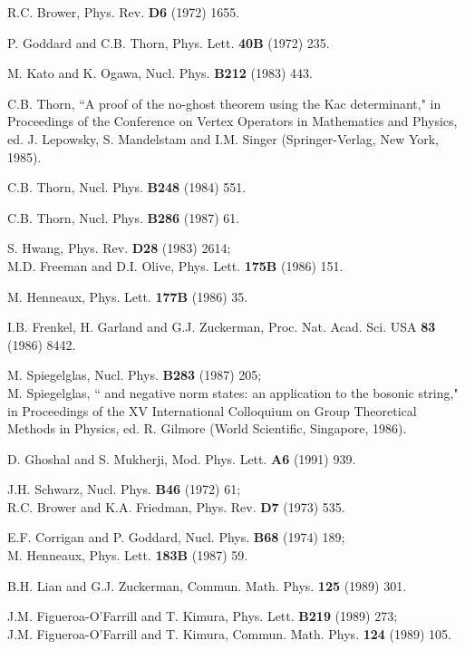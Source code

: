 \documentclass[a4paper,12pt]{article}
\begin{document}
\begin{thebibliography}{999}


R.C. Brower, Phys. Rev. {\bf D6} (1972) 1655.

P. Goddard and C.B. Thorn, Phys. Lett. {\bf 40B} (1972) 235.

M. Kato and K. Ogawa, Nucl. Phys. {\bf B212} (1983) 443.

C.B. Thorn, ``A proof of the no-ghost theorem using the Kac determinant,"
in Proceedings of the Conference on Vertex Operators
in Mathematics and Physics,
ed. J. Lepowsky, S. Mandelstam and I.M. Singer
(Springer-Verlag, New York, 1985).

C.B. Thorn, Nucl. Phys. {\bf B248} (1984) 551.

C.B. Thorn, Nucl. Phys. {\bf B286} (1987) 61.

S. Hwang, Phys. Rev. {\bf D28} (1983) 2614;\\
M.D. Freeman and D.I. Olive, Phys. Lett. {\bf 175B} (1986) 151.

M. Henneaux, Phys. Lett. {\bf 177B} (1986) 35.

I.B. Frenkel, H. Garland and G.J. Zuckerman, Proc. Nat. Acad. Sci. USA {\bf
83} (1986) 8442.

M. Spiegelglas, Nucl. Phys. {\bf B283} (1987) 205;\\
M. Spiegelglas, ``\coordHE{} and negative norm states:
an application to the bosonic string,"
in Proceedings of the XV International Colloquium
on Group Theoretical Methods in Physics,
ed. R. Gilmore (World Scientific, Singapore, 1986).

D. Ghoshal and S. Mukherji, Mod. Phys. Lett. {\bf A6} (1991) 939.

J.H. Schwarz, Nucl. Phys. {\bf B46} (1972) 61;\\
R.C. Brower and K.A. Friedman, Phys. Rev. {\bf D7} (1973) 535.

E.F. Corrigan and P. Goddard, Nucl. Phys. {\bf B68} (1974) 189;\\
M. Henneaux, Phys. Lett. {\bf 183B} (1987) 59.

B.H. Lian and G.J. Zuckerman, Commun. Math. Phys. {\bf 125} (1989) 301.

J.M. Figueroa-O'Farrill and T. Kimura, Phys. Lett. {\bf B219} (1989) 273;\\
J.M. Figueroa-O'Farrill and T. Kimura, Commun. Math. Phys. {\bf 124} (1989)
105.



\end{thebibliography}
\end{document}
